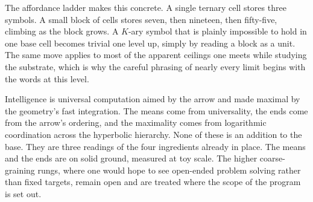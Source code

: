 The affordance ladder makes this concrete. A single ternary cell stores three symbols. A small block of cells
stores seven, then nineteen, then fifty-five, climbing as the block grows. A $K$-ary symbol that is plainly
impossible to hold in one base cell becomes trivial one level up, simply by reading a block as a unit. The same
move applies to most of the apparent ceilings one meets while studying the substrate, which is why the careful
phrasing of nearly every limit begins with the words at this level.


Intelligence is universal computation aimed by the arrow and made maximal by the geometry's fast integration. The
means come from universality, the ends come from the arrow's ordering, and the maximality comes from logarithmic
coordination across the hyperbolic hierarchy. None of these is an addition to the base. They are three readings of
the four ingredients already in place. The means and the ends are on solid ground, measured at toy scale. The
higher coarse-graining rungs, where one would hope to see open-ended problem solving rather than fixed targets,
remain open and are treated where the scope of the program is set out.
